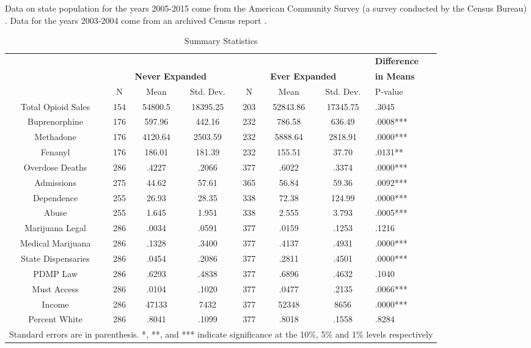 \documentclass[11pt]{article}
\begin{document}
Data on state population for the years 2005-2015 come from the American Community Survey (a survey conducted by the Census Bureau) \citep{U.S.CensusBureau2017}.  Data for the years 2003-2004 come from an archived Census report \citep{U.S.CensusBureau2006}.  



\begin{table}[htb]
\caption{Summary Statistics} 
\label{summary statistics}
\begin{adjustbox}{width=\textwidth,keepaspectratio}
\begin{tabular}{c|ccc|ccc|l}
 \multicolumn{7}{c|}{} & \textbf{Difference} \\
& \multicolumn{3}{|c|}{\textbf{Never Expanded}} & \multicolumn{3}{|c|}{\textbf{Ever Expanded}} & \textbf{in Means} \\ 
\hline \hline
 & N & Mean & Std. Dev. & N & Mean & Std. Dev. & P-value\\ \hline
Total Opioid Sales &154 & 54800.5 & 18395.25 & 203 & 52843.86 & 17345.75 & .3045\\
Buprenorphine &176 & 597.96 & 442.16 & 232 & 786.58 & 636.49 & .0008***\\
Methadone &176 & 4120.64 & 2503.59 & 232 & 5888.64 & 2818.91 & .0000***\\
Fenanyl  &176 & 186.01 & 181.39 & 232 & 155.51 & 37.70 & .0131**\\
Overdose Deaths  &286 & .4227 & .2066 & 377 & .6022 & .3374 & .0000***\\
Admissions  &275 & 44.62 & 57.61 & 365 & 56.84 & 59.36 & .0092***\\
Dependence  &255 & 26.93 & 28.35 & 338 & 72.38 & 124.99 & .0000***\\
Abuse  &255 & 1.645 & 1.951 & 338 & 2.555 & 3.793 & .0005***\\
Marijuana Legal  &286 & .0034 & .0591 & 377 & .0159 & .1253 & .1216\\
Medical Marijuana  &286 & .1328 & .3400 & 377 & .4137 & .4931 & .0000***\\
State Dispensaries &286 & .0454 & .2086 & 377 & .2811 & .4501 & .0000***\\
PDMP Law  &286 & .6293 & .4838 & 377 & .6896 & .4632 & .1040\\ 
Must Access  &286 & .0104 & .1020 & 377 & .0477 & .2135 & .0066***\\
Income  &286 & 47133 & 7432 & 377 & 52348 & 8656 & .0000***\\
Percent White  &286 & .8041 & .1099 & 377 & .8018 & .1558 & .8284\\
\hline
\multicolumn{8}{c}{\footnotesize{Standard errors are in parenthesis.  *, **, and *** indicate significance at the 10\%, 5\% and 1\% levels respectively}} \\


\hline
\end{tabular}
\end{adjustbox}
\end{table}
\end{document}
